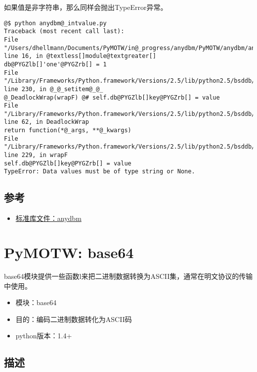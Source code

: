 \documentclass[letterpaper,10pt,english]{manual}
\begin{document}
如果值是非字符串，那么同样会抛出TypeError异常。

\begin{Verbatim}[commandchars=@\[\]]
@$ python anydbm@_intvalue.py
Traceback (most recent call last):
File "/Users/dhellmann/Documents/PyMOTW/in@_progress/anydbm/PyMOTW/anydbm/anydbm@_intvalue.py", line 16, in @textless[]module@textgreater[]
db@PYGZlb[]'one'@PYGZrb[] = 1
File "/Library/Frameworks/Python.framework/Versions/2.5/lib/python2.5/bsddb/@_@_init@_@_.py", line 230, in @_@_setitem@_@_
@_DeadlockWrap(wrapF) @# self.db@PYGZlb[]key@PYGZrb[] = value
File "/Library/Frameworks/Python.framework/Versions/2.5/lib/python2.5/bsddb/dbutils.py", line 62, in DeadlockWrap
return function(*@_args, **@_kwargs)
File "/Library/Frameworks/Python.framework/Versions/2.5/lib/python2.5/bsddb/@_@_init@_@_.py", line 229, in wrapF
self.db@PYGZlb[]key@PYGZrb[] = value
TypeError: Data values must be of type string or None.
\end{Verbatim}


\subsection{参考}
\begin{itemize}
\item {} 
\href{http://docs.python.org/lib/module-anydbm.html}{标准库文件：anydbm}

\end{itemize}

\resetcurrentobjects


\clearpage\section{PyMOTW: base64}

base64模块提供一些函数l来把二进制数据转换为ASCII集，通常在明文协议的传输中使用。
\begin{itemize}
\item {} 
模块：base64

\item {} 
目的：编码二进制数据转化为ASCII码

\item {} 
python版本：1.4+

\end{itemize}


\subsection{描述}
\end{document}
